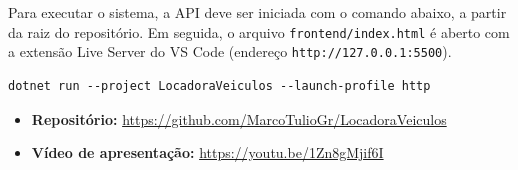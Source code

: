 \documentclass[12pt]{article}
\begin{document}
Para executar o sistema, a API deve ser iniciada com o comando abaixo, a partir da raiz do repositório. Em seguida, o arquivo \texttt{frontend/index.html} é aberto com a extensão Live Server do VS Code (endereço \texttt{http://127.0.0.1:5500}).

\begin{lstlisting}
dotnet run --project LocadoraVeiculos --launch-profile http
\end{lstlisting}

\begin{itemize}
  \item \textbf{Repositório:} \url{https://github.com/MarcoTulioGr/LocadoraVeiculos}
  \item \textbf{Vídeo de apresentação:} \url{https://youtu.be/1Zn8gMjif6I}
\end{itemize}
\end{document}

